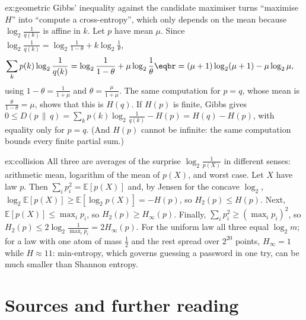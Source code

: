 \begin{solution}{ex:geometric}
\idea Gibbs' inequality against the candidate maximiser turns ``maximise $H$'' into ``compute a cross-entropy'', which only depends on the mean because $\log_2\frac1{q(k)}$ is affine in $k$.
\writeup Let $p$ have mean $\mu$. Since $\log_2\frac1{q(k)}=\log_2\frac1{1-\theta}+k\log_2\frac1\theta$,
\[
\begin{aligned}\sum_kp(k)\log_2\frac1{q(k)}&=\log_2\frac1{1-\theta}+\mu\log_2\frac1\theta\eqbr=(\mu+1)\log_2(\mu+1)-\mu\log_2\mu,\end{aligned}
\]
using $1-\theta=\frac1{1+\mu}$ and $\theta=\frac\mu{1+\mu}$. The same computation for $p=q$, whose mean is $\frac\theta{1-\theta}=\mu$, shows that this is $H(q)$. If $H(p)$ is finite, Gibbs gives $0\le D(p\,\|\,q)=\sum_kp(k)\log_2\frac1{q(k)}-H(p)=H(q)-H(p)$, with equality only for $p=q$. (And $H(p)$ cannot be infinite: the same computation bounds every finite partial sum.)
\end{solution}

\begin{solution}{ex:collision}
\idea All three are averages of the surprise $\log_2\frac1{p(X)}$ in different senses: arithmetic mean, logarithm of the mean of $p(X)$, and worst case.
\writeup Let $X$ have law $p$. Then $\sum_ip_i^2=\mathbb E[p(X)]$ and, by Jensen for the concave $\log_2$, $\log_2\mathbb E[p(X)]\ge\mathbb E[\log_2p(X)]=-H(p)$, so $H_2(p)\le H(p)$. Next, $\mathbb E[p(X)]\le\max_ip_i$, so $H_2(p)\ge H_\infty(p)$. Finally, $\sum_ip_i^2\ge(\max_ip_i)^2$, so $H_2(p)\le2\log_2\frac1{\max_ip_i}=2H_\infty(p)$. For the uniform law all three equal $\log_2m$; for a law with one atom of mass $\frac12$ and the rest spread over $2^{20}$ points, $H_\infty=1$ while $H\approx11$: min-entropy, which governs guessing a password in one try, can be much smaller than Shannon entropy.
\end{solution}

\section*{Sources and further reading}


